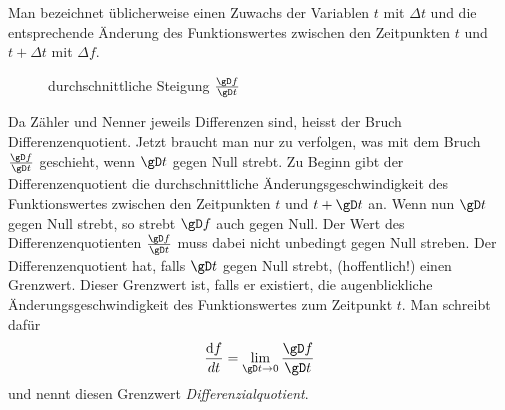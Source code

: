 \documentclass[%
11pt,%
twoside,%
titlepage,%
german,%
headsepline%
]{scrartcl}
\begin{document}
Man bezeichnet \"ublicherweise einen Zuwachs der Variablen $t$ mit $\Delta t$ und die entsprechende \"Anderung des Funktionswertes zwischen den Zeitpunkten $t$ und $t+\Delta t$ mit $\Delta f$.
\begin{figure}
\centering
{}
\caption{durchschnittliche Steigung $\frac{\gD f}{\gD t}$}
\end{figure}
Da Z\"ahler und Nenner jeweils Differenzen sind, heisst der Bruch Differenzenquotient. Jetzt braucht man nur zu verfolgen, was mit dem Bruch $\frac{\gD f}{\gD t}$ geschieht, wenn $\gD t$ gegen Null strebt. Zu Beginn gibt der Differenzenquotient die durchschnittliche \"Anderungsgeschwindigkeit des Funktionswertes zwischen den Zeitpunkten $t$ und $t+\gD t$ an. Wenn nun $\gD t$ gegen Null strebt, so strebt $\gD f$ auch gegen Null. Der Wert des Differenzenquotienten $\frac{\gD f}{\gD t}$ muss dabei nicht unbedingt gegen Null streben. Der Differenzenquotient hat, falls $\gD t$ gegen Null strebt, (hoffentlich!) einen Grenzwert. Dieser Grenzwert ist, falls er existiert, die augenblickliche \"Anderungsgeschwindigkeit des Funktionswertes zum Zeitpunkt $t$.
Man schreibt daf\"ur
$$\frac{\mathrm{d}f}{dt}=\lim_{\gD t\to0}\frac{\gD f}{\gD t}$$
und nennt diesen Grenzwert \emph{Differenzialquotient}.
\end{document}
